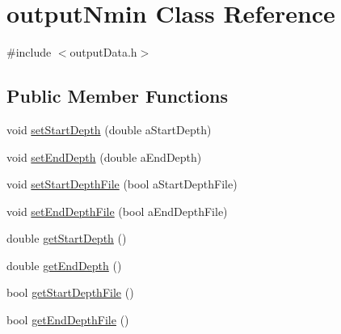 \hypertarget{classoutput_nmin}{
\section{outputNmin Class Reference}
\label{classoutput_nmin}
}


{\ttfamily \#include $<$outputData.h$>$}\subsection*{Public Member Functions}
\begin{DoxyCompactItemize}
\item 
void \hyperlink{classoutput_nmin_a7e1e189090ae756a84bf75b3055b4458}{setStartDepth} (double aStartDepth)
\item 
void \hyperlink{classoutput_nmin_aa5167e0b3600262feb29e563096b0d9a}{setEndDepth} (double aEndDepth)
\item 
void \hyperlink{classoutput_nmin_a968dc4cfe2b4420becc78d732416cf90}{setStartDepthFile} (bool aStartDepthFile)
\item 
void \hyperlink{classoutput_nmin_aea2f9d9bdb9c36f106a21e2c87569396}{setEndDepthFile} (bool aEndDepthFile)
\item 
double \hyperlink{classoutput_nmin_ae9d114be97afae6260255b1a6a137c5d}{getStartDepth} ()
\item 
double \hyperlink{classoutput_nmin_ae8ae1e283890490fbb5a88a3e3ff7bb5}{getEndDepth} ()
\item 
bool \hyperlink{classoutput_nmin_a318f67d5b57a4a404d682675fee229cb}{getStartDepthFile} ()
\item 
bool \hyperlink{classoutput_nmin_aa56eff79e8399aa26d8d9b265a946712}{getEndDepthFile} ()
\end{DoxyCompactItemize}



